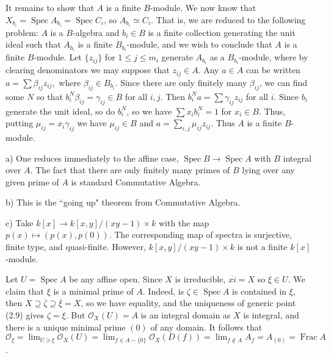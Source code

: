 \documentclass{report}
\renewcommand{\O}{\mathcal{O}}
\DeclareMathOperator{\Spec}{Spec}
\DeclareMathOperator{\Frac}{Frac}
\begin{document}
It remains to show that $A$ is a finite $B$-module.  We now know that $X_{b_i}=\Spec A_{b_i}=\Spec C_i$, so
$A_{b_i}\simeq C_i$.  That is, we are reduced to the following problem: $A$ is a $B$-algebra and $b_i\in B$
is a finite collection generating the unit ideal such that $A_{b_i}$ is a finite $B_{b_i}$-module, and we 
wish to conclude that $A$ is a finite $B$-module.	Let $\{z_{ij}\}$ for $1\le j\le m_i$ generate
$A_{b_i}$ as a $B_{b_i}$-module, where by clearing denominators we may suppose that $z_{ij}\in A$.	
Any $a\in A$ can be written
$a=\sum \beta_{ij}	z_{ij},$ where $\beta_{ij}\in B_{b_i}$.  Since there are only finitely many $\beta_{ij}$,
we can find some $N$ so that $b_i^N\beta_{ij}=\gamma_{ij}\in B$ for all $i,j$.
Then $b_i^N a =\sum \gamma_{ij} z_{ij}$ for all $i$.  Since $b_i$ generate the unit ideal, so do $b_i^N$,
so we have $\sum x_i b_i^N=1$ for $x_i\in B$.  Thus, putting $\mu_{ij}= x_i\gamma_{ij}$ we have $\mu_{ij}\in B$ and
$a=\sum_{i,j} \mu_{ij} z_{ij}$.  Thus $A$ is a finite $B$-module.

\bigskip
{}	a)	One reduces immediately to the affine case, $\Spec B\rightarrow \Spec A$ with $B$ integral over $A$.
The fact that there are only finitely many primes of $B$ lying over any given prime of $A$ is standard Commutative
Algebra.

\noindent
b)	This is the ``going up" theorem from Commutative Algebra.

\noindent
c)	Take $k[x]\rightarrow k[x,y]/(xy-1)\times k$ with the map $p(x)\mapsto (p(x),p(0))$.  The corresponding
map of spectra is surjective, finite type, and quasi-finite.  However, $k[x,y]/(xy-1)\times k$ is not a finite $k[x]$-module.

\bigskip
{}	Let $U=\Spec A$ be any affine open.  Since $X$ is irreducible, $\overline{xi}=X$ so $\xi\in U$.
We claim that $\xi$ is a minimal prime of $A$.  Indeed, is $\zeta\in\Spec A$ is contained in $\xi$,
then $X\supseteq \overline{\zeta}\supseteq \overline{\xi}=X$, so we have equality, and the uniqueness
of generic point (2.9) gives $\zeta=\xi$.  But $\O_X(U)=A$ is an integral domain as $X$ is integral,
and there is a unique minimal prime $(0)$ of any domain.  It follows that 
$\O_{\xi}=\lim_{U\ni \xi} \O_X(U)=\lim_{f\in A-\{0\}} \O_{X}(D(f))=\lim_{f\not\in A} A_f=A_{(0)}=\Frac A$.
\end{document}
